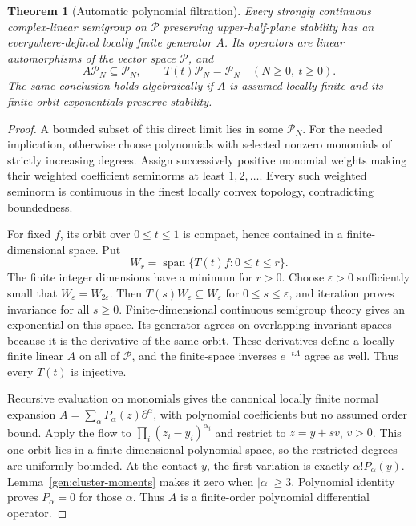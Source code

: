 \documentclass[reqno]{amsart}
\newtheorem{theorem}{Theorem}[section]
\theoremstyle{definition}
\theoremstyle{remark}
\begin{document}
\begin{theorem}[Automatic polynomial filtration]\label{ana:filtration}
Every strongly continuous complex-linear semigroup on \(\mathcal P\)
preserving upper-half-plane stability has an everywhere-defined locally
finite generator \(A\).  Its operators are linear automorphisms of the
vector space \(\mathcal P\), and
\[
 A\mathcal P_N\subseteq\mathcal P_N,\qquad
 T(t)\mathcal P_N=\mathcal P_N
 \quad(N\ge0,\ t\ge0).
\]
The same conclusion holds algebraically if \(A\) is assumed locally finite
and its finite-orbit exponentials preserve stability.
\end{theorem}
\begin{proof}
A bounded subset of this direct limit lies in some \(\mathcal P_N\).
For the needed implication, otherwise choose polynomials with selected
nonzero monomials of strictly increasing degrees.  Assign successively
positive monomial weights making their weighted coefficient seminorms
at least \(1,2,\ldots\).  Every such weighted seminorm is continuous in
the finest locally convex topology, contradicting boundedness.

For fixed \(f\), its orbit over \(0\le t\le1\) is compact, hence contained
in a finite-dimensional space.  Put
\[
 W_r=\operatorname{span}\{T(t)f:0\le t\le r\}.
\]
The finite integer dimensions have a minimum for \(r>0\).  Choose
\(\varepsilon>0\) sufficiently small that
\(W_\varepsilon=W_{2\varepsilon}\).
Then \(T(s)W_\varepsilon\subseteq W_\varepsilon\) for
\(0\le s\le\varepsilon\), and iteration proves invariance for all \(s\ge0\).
Finite-dimensional continuous semigroup theory gives an exponential
on this space.  Its generator agrees on overlapping invariant spaces
because it is the derivative of the same orbit.  These derivatives define
a locally finite linear \(A\) on all of \(\mathcal P\), and the finite-space
inverses \(e^{-tA}\) agree as well.  Thus every \(T(t)\) is injective.

Recursive evaluation on monomials gives the canonical locally finite
normal expansion \(A=\sum_\alpha P_\alpha(z)\partial^\alpha\), with
polynomial coefficients but no assumed order bound.  Apply the flow to
\(\prod_i(z_i-y_i)^{\alpha_i}\) and restrict to \(z=y+sv\), \(v>0\).
This one orbit lies in a finite-dimensional polynomial space, so the
restricted degrees are uniformly bounded.  At the contact \(y\),
the first variation is exactly \(\alpha!P_\alpha(y)\).
Lemma~\ref{gen:cluster-moments} makes it zero when \(|\alpha|\ge3\).
Polynomial identity proves \(P_\alpha=0\) for those \(\alpha\).
Thus \(A\) is a finite-order polynomial differential operator.


\end{proof}
\end{document}
